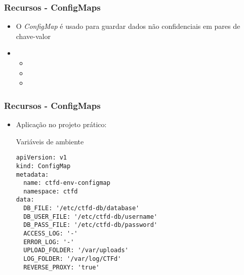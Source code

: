 \begin{frame}
\frametitle{Recursos - ConfigMaps}
\begin{itemize}
	\item O \textit{ConfigMap} é usado para guardar dados não confidenciais em pares de chave-valor
	\item {}
		\begin{itemize}
			\item {}
			\item {}
			\item {}
		\end{itemize}
\end{itemize}
\end{frame}

\begin{frame}[containsverbatim]
\frametitle{Recursos - ConfigMaps}
\begin{itemize}
	\item Aplicação no projeto prático:
\begin{center}
\begin{minipage}{0.9\textwidth}
\begin{block}{Variáveis de ambiente}
\begin{lstlisting}
apiVersion: v1
kind: ConfigMap
metadata:
  name: ctfd-env-configmap
  namespace: ctfd
data:
  DB_FILE: '/etc/ctfd-db/database'
  DB_USER_FILE: '/etc/ctfd-db/username'
  DB_PASS_FILE: '/etc/ctfd-db/password'
  ACCESS_LOG: '-'
  ERROR_LOG: '-'
  UPLOAD_FOLDER: '/var/uploads'
  LOG_FOLDER: '/var/log/CTFd'
  REVERSE_PROXY: 'true'
\end{lstlisting}
\end{block}
\end{minipage}
\end{center}
\end{itemize}
\end{frame}

